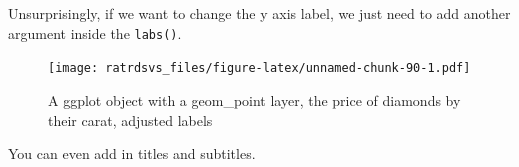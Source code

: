 \documentclass[
]{book}
\newenvironment{Shaded}{\begin{snugshade}}{\end{snugshade}}
\newcommand{\DataTypeTok}[1]{\textcolor[rgb]{0.13,0.29,0.53}{#1}}
\newcommand{\DecValTok}[1]{\textcolor[rgb]{0.00,0.00,0.81}{#1}}
\newcommand{\FloatTok}[1]{\textcolor[rgb]{0.00,0.00,0.81}{#1}}
\newcommand{\KeywordTok}[1]{\textcolor[rgb]{0.13,0.29,0.53}{\textbf{#1}}}
\newcommand{\NormalTok}[1]{#1}
\newcommand{\OperatorTok}[1]{\textcolor[rgb]{0.81,0.36,0.00}{\textbf{#1}}}
\newcommand{\StringTok}[1]{\textcolor[rgb]{0.31,0.60,0.02}{#1}}
\begin{document}
Unsurprisingly, if we want to change the y axis label, we just need to add another argument inside the \texttt{labs()}.

\begin{Shaded}
\end{Shaded}

\begin{figure}
\centering
\texttt{[image: ratrdsvs\_files/figure-latex/unnamed-chunk-90-1.pdf]}
\caption{\label{fig:unnamed-chunk-90}A ggplot object with a geom\_point layer, the price of diamonds by their carat, adjusted labels}
\end{figure}

You can even add in titles and subtitles.
\end{document}
